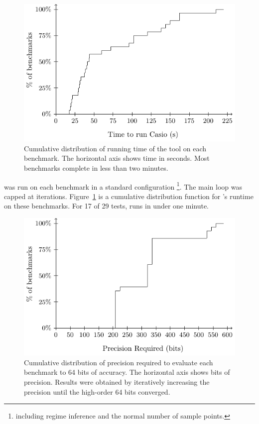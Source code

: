 \documentclass[paper.tex]{subfiles}
\begin{document}
\begin{figure}
\includegraphics[width=0.9\columnwidth]{fig/eval-casio-time.pdf}
\caption{Cumulative distribution of running time of the \casio tool on
  each benchmark. The horizontal axis shows time in seconds. Most
  benchmarks complete in less than two minutes.}
\label{fig:eval-casio-time}
\end{figure}

\casio was run on each benchmark in a standard configuration%
\footnote{including regime inference and the normal number of sample
  points.}.  The main loop was capped at \nIters iterations.
Figure~\ref{fig:eval-casio-time} is a cumulative distribution function for
\casio's runtime on these benchmarks.  For 17 of 29 tests, \casio runs
in under one minute. 

\begin{figure}
\includegraphics[width=0.9\columnwidth]{fig/eval-mpfr-bits.pdf}
\caption{Cumulative distribution of precision required to evaluate
  each benchmark to 64 bits of accuracy. The horizontal axis shows
  bits of precision. Results were obtained by iteratively increasing
  the precision until the high-order 64 bits converged.}
\label{fig:eval-mpfr-bits}
\end{figure}
\end{document}
